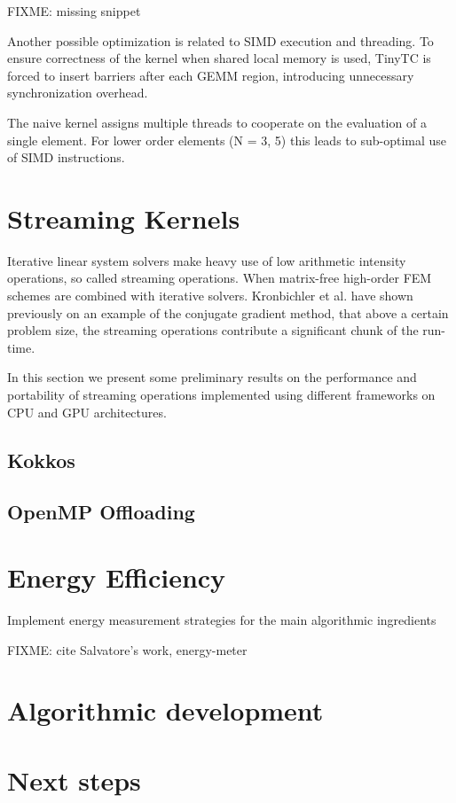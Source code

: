 \documentclass[a4paper,12pt]{article}
\begin{document}
FIXME: missing snippet

Another possible optimization is related to SIMD execution and threading.
To ensure correctness of the kernel when shared local memory is used, TinyTC is forced to insert barriers
after each GEMM region, introducing unnecessary synchronization overhead.

The naive kernel assigns multiple threads to cooperate on the evaluation of a single element.
For lower order elements (N = 3, 5) this leads to sub-optimal use of SIMD instructions. 

\section{Streaming Kernels}

Iterative linear system solvers make heavy use of low arithmetic intensity operations, so called streaming operations.
When matrix-free high-order FEM schemes are combined with iterative solvers. 
Kronbichler et al. \cite{} have shown previously on an example of the conjugate gradient method, that above a certain problem size, the streaming operations contribute a significant chunk of the run-time.

In this section we present some preliminary results on the performance and portability of
streaming operations implemented using different frameworks on CPU and GPU architectures.

\subsection{Kokkos}

\subsection{OpenMP Offloading}


\section{Energy Efficiency}

Implement energy measurement strategies for the main algorithmic ingredients

FIXME: cite Salvatore's work, energy-meter 

\section{Algorithmic development}


\section{Next steps}
\end{document}
